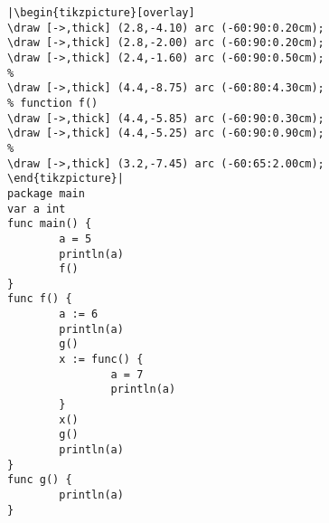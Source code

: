 \begin{lstlisting}[caption=Scope and function literals,label=src:scope3]
|\begin{tikzpicture}[overlay]
\draw [->,thick] (2.8,-4.10) arc (-60:90:0.20cm);
\draw [->,thick] (2.8,-2.00) arc (-60:90:0.20cm);
\draw [->,thick] (2.4,-1.60) arc (-60:90:0.50cm);
%
\draw [->,thick] (4.4,-8.75) arc (-60:80:4.30cm);
% function f()
\draw [->,thick] (4.4,-5.85) arc (-60:90:0.30cm);
\draw [->,thick] (4.4,-5.25) arc (-60:90:0.90cm);
%
\draw [->,thick] (3.2,-7.45) arc (-60:65:2.00cm);
\end{tikzpicture}|
package main
var a int
func main() {
        a = 5
        println(a)
        f()
}
func f() {
        a := 6
        println(a)
        g()
        x := func() {
                a = 7
                println(a)
        }
        x()
        g()
        println(a)
}
func g() {
        println(a)
}
\end{lstlisting}
